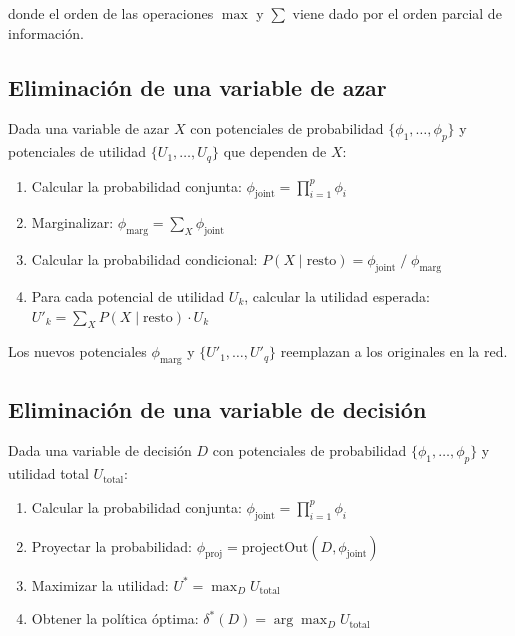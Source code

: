 \documentclass[11pt,a4paper]{article}
\begin{document}
donde el orden de las operaciones $\max$ y $\sum$ viene dado por el orden
parcial de informaci\'{o}n.

\subsection{Eliminaci\'{o}n de una variable de azar}

Dada una variable de azar $X$ con potenciales de probabilidad
$\{\phi_1, \ldots, \phi_p\}$ y potenciales de utilidad $\{U_1, \ldots, U_q\}$
que dependen de $X$:

\begin{enumerate}
  \item Calcular la probabilidad conjunta:
        $\phi_{\mathrm{joint}} = \prod_{i=1}^{p} \phi_i$
  \item Marginalizar:
        $\phi_{\mathrm{marg}} = \sum_{X} \phi_{\mathrm{joint}}$
  \item Calcular la probabilidad condicional:
        $P(X \mid \mathrm{resto}) = \phi_{\mathrm{joint}} \;/\; \phi_{\mathrm{marg}}$
  \item Para cada potencial de utilidad $U_k$, calcular la utilidad esperada:
        $U'_k = \sum_{X} P(X \mid \mathrm{resto}) \cdot U_k$
\end{enumerate}

Los nuevos potenciales $\phi_{\mathrm{marg}}$ y $\{U'_1, \ldots, U'_q\}$ reemplazan
a los originales en la red.

\subsection{Eliminaci\'{o}n de una variable de decisi\'{o}n}

Dada una variable de decisi\'{o}n $D$ con potenciales de probabilidad
$\{\phi_1, \ldots, \phi_p\}$ y utilidad total $U_{\mathrm{total}}$:

\begin{enumerate}
  \item Calcular la probabilidad conjunta:
        $\phi_{\mathrm{joint}} = \prod_{i=1}^{p} \phi_i$
  \item Proyectar la probabilidad:
        $\phi_{\mathrm{proj}} = \mathrm{projectOut}(D, \phi_{\mathrm{joint}})$
  \item Maximizar la utilidad:
        $U^* = \max_{D} U_{\mathrm{total}}$
  \item Obtener la pol\'{i}tica \'{o}ptima:
        $\delta^*(D) = \arg\max_{D} U_{\mathrm{total}}$
\end{enumerate}
\end{document}
